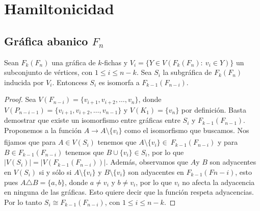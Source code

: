 \chapter{Hamiltonicidad}%
\label{cap:hamilt}

\section{Gr\'afica abanico $F_n$}%
\label{sec:SimpleFan}

\begin{proposicion}
        \label{prop:iso-SFan}
            Sean $F_k(F_n)$ una gr\'afica de $k$-fichas y $V_i=\{ Y \in
            V(F_k(F_n) \colon\ v_i \in Y) \}$ un subconjunto de v\'ertices, con
            $1 \leq i \leq n-k$. Sea $S_i$ la subgr\'afica de $F_k(F_n)$
            inducida  por $V_i$. Entoncess $S_i$ es isomorfa a
            $F_{k-1}(F_{n-i})$.
        \end{proposicion}
    
        \begin{proof}
            Sea $V(F_{n-i}) = \{v_{i+1}, v_{i+2}, \dots, v_n\}$, donde
            $V(P_{n-i-1}) = \{v_{i+1}, v_{i+2}, \dots, v_{n-1}\}$ y $V(K_1)=
            \{v_n\}$ por definici\'on. Basta demostrar que existe un isomorfismo
            entre gr\'aficas entre $S_i$ y $F_{k-1}(F_{n-1})$. Proponemos a la
            funci\'on $A \xrightarrow[]{} A \setminus \{v_i\}$ como el
            isomorfismo que buscamos. Nos fijamos que para $A \in V(S_i)$
            tenemos que $A \setminus \{v_i\} \in \ F_{k-1}(F_{n-i})$  y para $B
            \in F_{k-1}(F_{n-i})$ tenemos que $B \cup \{v_i\} \in S_i$, por lo
            que $|V(S_i)|=|V(F_{k-1}(F_{n-i}))|$. Adem\'as, observamos que $A$y
            $B $ son adyacentes en $V(S_i)$ si y s\'olo si $A \setminus \{v_i\}$
            y $B \setminus \{v_i\}$ son adyacentes en $F_{k-1}(F{n-i})$, esto
            pues $A\triangle B = \{a,b\}$, donde $a\neq v_i$ y $b \neq v_i$, por
            lo que $v_i$ no afecta la adyacencia en ninguna de las gr\'aficas.
            Esto quiere decir que la funci\'on respeta adyacencias. Por lo tanto
            $S_i \cong F_{k-1}(F_{n-i})$, con $1 \leq i \leq n-k$.
        \end{proof}
    
